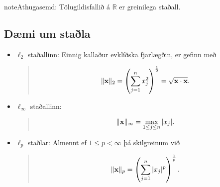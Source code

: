 \documentclass[letterpaper,10pt,icelandic]{sphinxmanual}
\begin{document}
\begin{notice}{note}{Athugasemd:}
Tölugildisfallið á \({\mathbb  R}\) er greinilega staðall.
\end{notice}


\subsection{Dæmi um staðla}
\label{kafli08:daemi-um-stala}\begin{itemize}
\item {} 
\(\ell_2\) staðallinn: Einnig kallaður evklíðska fjarlægðin, er gefinn með
\begin{quote}
\begin{gather}
\begin{split}\|\mbox{${\bf x}$}\|_2 = \left( \sum_{j=1}^n x_j^2 \right)^{\frac 12} =
\sqrt{\mbox   {${\bf x}$}\cdot \mbox{${\bf x}$}}.\end{split}\notag
\end{gather}\end{quote}

\item {} 
\(\ell_\infty\) staðallinn:
\begin{quote}
\begin{gather}
\begin{split}\|\mbox{${\bf x}$}\|_\infty = \max_{1\leq j \leq n} |x_j|.\end{split}\notag
\end{gather}\end{quote}

\item {} 
\(\ell_p\) staðlar: Almennt ef \(1\leq p < \infty\) þá skilgreinum við
\begin{quote}
\begin{gather}
\begin{split}\|\mbox{${\bf x}$}\|_p = \left( \sum_{j=1}^n |x_j|^p \right)^{\frac 1p}.\end{split}\notag
\end{gather}\end{quote}

\end{itemize}

\end{document}

